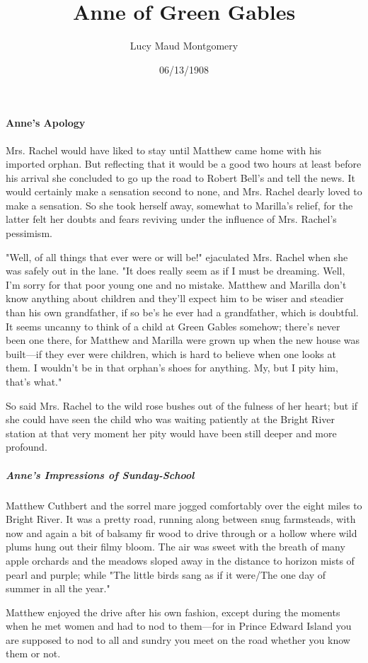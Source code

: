 \documentclass{article}
\title{Anne of Green Gables}
\author{Lucy Maud Montgomery}
\date{06/13/1908}
\begin{document}
\maketitle

\paragraph{Anne's Apology}
Mrs. Rachel would have liked to stay until Matthew came home with his imported orphan. But reflecting that it would be a good two hours at least before his arrival she concluded to go up the road to Robert Bell's and tell the news. It would certainly make a sensation second to none, and Mrs. Rachel dearly loved to make a sensation. So she took herself away, somewhat to Marilla's relief, for the latter felt her doubts and fears reviving under the influence of Mrs. Rachel's pessimism.

"Well, of all things that ever were or will be!" ejaculated Mrs. Rachel when she was safely out in the lane. "It does really seem as if I must be dreaming. Well, I'm sorry for that poor young one and no mistake. Matthew and Marilla don't know anything about children and they'll expect him to be wiser and steadier than his own grandfather, if so be's he ever had a grandfather, which is doubtful. It seems uncanny to think of a child at Green Gables somehow; there's never been one there, for Matthew and Marilla were grown up when the new house was built---if they ever were children, which is hard to believe when one looks at them. I wouldn't be in that orphan's shoes for anything. My, but I pity him, that's what."

So said Mrs. Rachel to the wild rose bushes out of the fulness of her heart; but if she could have seen the child who was waiting patiently at the Bright River station at that very moment her pity would have been still deeper and more profound.

\subparagraph{Anne's Impressions of Sunday-School}
Matthew Cuthbert and the sorrel mare jogged comfortably over the eight miles to Bright River. It was a pretty road, running along between snug farmsteads, with now and again a bit of balsamy fir wood to drive through or a hollow where wild plums hung out their filmy bloom. The air was sweet with the breath of many apple orchards and the meadows sloped away in the distance to horizon mists of pearl and purple; while "The little birds sang as if it were/The one day of summer in all the year."

Matthew enjoyed the drive after his own fashion, except during the moments when he met women and had to nod to them---for in Prince Edward Island you are supposed to nod to all and sundry you meet on the road whether you know them or not.
\end{document}
